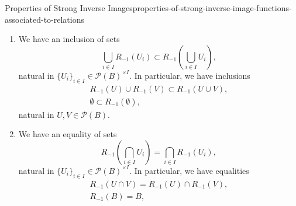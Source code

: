 \begin{proposition}{Properties of Strong Inverse Images}{properties-of-strong-inverse-image-functions-associated-to-relations}
\begin{enumerate}
\begin{webcompile}
            \end{webcompile}
            witnessed by a bijections of sets
            \[%
                \Hom_{\mathcal{P}(A)}(R_{*}(U),V)%
                \cong%
                \Hom_{\mathcal{P}(A)}(U,R_{-1}(V)),%
            \]%
            natural in $U\in\mathcal{P}(A)$ and $V\in\mathcal{P}(B)$, i.e.\ such that:
            \begin{itemize}
                \itemstar The following conditions are equivalent:
                    \begin{itemize}
                        \item We have $R_{*}(U)\subset V$.
                        \item We have $U\subset R_{-1}(V)$.
                    \end{itemize}
            \end{itemize}
        \item\label{properties-of-strong-inverse-image-functions-associated-to-relations-lax-preservation-of-colimits}We have an inclusion of sets
            \[
                \bigcup_{i\in I}R_{-1}(U_{i})%
                \subset%
                R_{-1}(\bigcup_{i\in I}U_{i}),%
            \]%
            natural in $\{U_{i}\}_{i\in I}\in\mathcal{P}(B)^{\times I}$. In particular, we have inclusions%
            \[
                \begin{gathered}
                    R_{-1}(U)\cup R_{-1}(V) \subset R_{-1}(U\cup V),\\
                    \emptyset               \subset R_{-1}(\emptyset),
                \end{gathered}
            \]%
            natural in $U,V\in\mathcal{P}(B)$.
        \item\label{properties-of-strong-inverse-image-functions-associated-to-relations-preservation-of-limits}We have an equality of sets
            \[
                    R_{-1}(\bigcap_{i\in I}U_{i})%
                    =%
                    \bigcap_{i\in I}R_{-1}(U_{i}),%
            \]%
            natural in $\{U_{i}\}_{i\in I}\in\mathcal{P}(B)^{\times I}$. In particular, we have equalities%
            \[
                \begin{gathered}
                    R_{-1}(U\cap V) = R_{-1}(U)\cap R_{-1}(V),\\
                    R_{-1}(B)       = B,
                \end{gathered}
            \]%

\end{enumerate}
\end{proposition}
